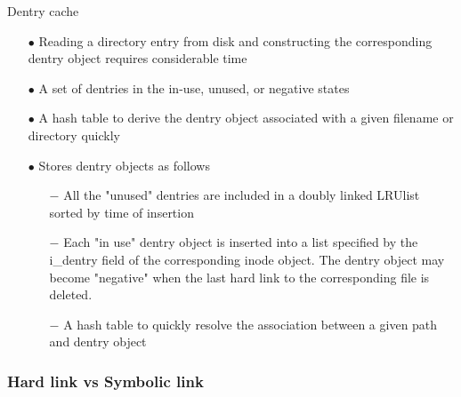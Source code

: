 \documentclass{beamer}
\begin{document}
\begin{frame}{Dentry cache}
	\begin{itemize}[<+->]
		\item[$\bullet$]{Reading a directory entry from disk and constructing the corresponding dentry object requires considerable time}
		\item[$\bullet$]{A set of dentries in the in-use, unused, or negative states}
		\item[$\bullet$]{A hash table to derive the dentry object associated with a given filename or directory quickly}
		\item[$\bullet$]{Stores dentry objects as follows}
			\begin{itemize}
				\item[$-$]{All the "unused" dentries are included in a doubly linked LRU\footnotemark[1] list sorted by time of insertion}
				\item[$-$]{Each "in use" dentry object is inserted into a list specified by the i\_dentry field of the corresponding inode object. The dentry object may become "negative" when the last hard link to the corresponding file is deleted.}
				\item[$-$]{A hash table to quickly resolve the association between a given path and dentry object}
			\end{itemize}
	\end{itemize}


\end{frame}

\subsubsection{Hard link vs Symbolic link}
\end{document}
